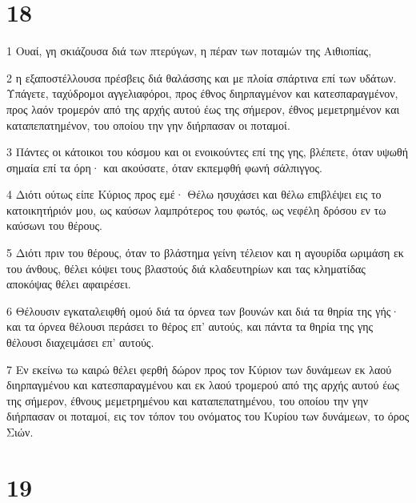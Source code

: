 \chapter{18}

\par 1 Ουαί, γη σκιάζουσα διά των πτερύγων, η πέραν των ποταμών της Αιθιοπίας,
\par 2 η εξαποστέλλουσα πρέσβεις διά θαλάσσης και με πλοία σπάρτινα επί των υδάτων. Υπάγετε, ταχύδρομοι αγγελιαφόροι, προς έθνος διηρπαγμένον και κατεσπαραγμένον, προς λαόν τρομερόν από της αρχής αυτού έως της σήμερον, έθνος μεμετρημένον και καταπεπατημένον, του οποίου την γην διήρπασαν οι ποταμοί.
\par 3 Πάντες οι κάτοικοι του κόσμου και οι ενοικούντες επί της γης, βλέπετε, όταν υψωθή σημαία επί τα όρη· και ακούσατε, όταν εκπεμφθή φωνή σάλπιγγος.
\par 4 Διότι ούτως είπε Κύριος προς εμέ· Θέλω ησυχάσει και θέλω επιβλέψει εις το κατοικητήριόν μου, ως καύσων λαμπρότερος του φωτός, ως νεφέλη δρόσου εν τω καύσωνι του θέρους.
\par 5 Διότι πριν του θέρους, όταν το βλάστημα γείνη τέλειον και η αγουρίδα ωριμάση εκ του άνθους, θέλει κόψει τους βλαστούς διά κλαδευτηρίων και τας κληματίδας αποκόψας θέλει αφαιρέσει.
\par 6 Θέλουσιν εγκαταλειφθή ομού διά τα όρνεα των βουνών και διά τα θηρία της γής· και τα όρνεα θέλουσι περάσει το θέρος επ' αυτούς, και πάντα τα θηρία της γης θέλουσι διαχειμάσει επ' αυτούς.
\par 7 Εν εκείνω τω καιρώ θέλει φερθή δώρον προς τον Κύριον των δυνάμεων εκ λαού διηρπαγμένου και κατεσπαραγμένου και εκ λαού τρομερού από της αρχής αυτού έως της σήμερον, έθνους μεμετρημένου και καταπεπατημένου, του οποίου την γην διήρπασαν οι ποταμοί, εις τον τόπον του ονόματος του Κυρίου των δυνάμεων, το όρος Σιών.

\chapter{19}

